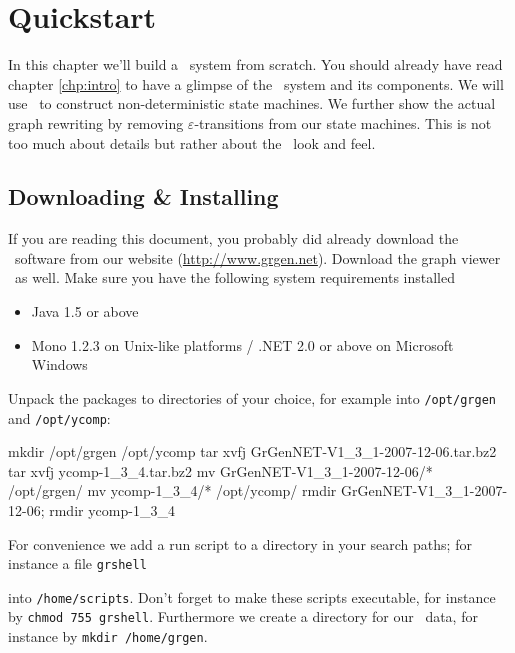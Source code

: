 \chapter{Quickstart}

In this chapter we'll build a \GrG\ system from scratch. 
You should already have read chapter \ref{chp:intro} to have a glimpse of the \GrG\ system and its components.
We will use \GrG\ to construct non-deterministic state machines.
We further show the actual graph rewriting by removing $\varepsilon$-transitions from our state machines.
This is not too much about details but rather about the \GrG\ look and feel.

\section{Downloading \& Installing}
If you are reading this document, you probably did already download the \GrG\ software from our website (\url{http://www.grgen.net}).
Download the graph viewer \yComp\ as well.
Make sure you have the following system requirements installed
\begin{itemize}
	\item Java 1.5 or above
	\item Mono 1.2.3 on Unix-like platforms / .NET 2.0 or above on Microsoft Windows 
\end{itemize}
Unpack the packages to directories of your choice, for example into \texttt{/opt/grgen} and \texttt{/opt/ycomp}:
\begin{bash}
mkdir /opt/grgen /opt/ycomp
tar xvfj GrGenNET-V1_3_1-2007-12-06.tar.bz2
tar xvfj ycomp-1_3_4.tar.bz2
mv GrGenNET-V1_3_1-2007-12-06/* /opt/grgen/
mv ycomp-1_3_4/* /opt/ycomp/
rmdir GrGenNET-V1_3_1-2007-12-06; rmdir ycomp-1_3_4
\end{bash}
For convenience we add a run script to a directory in your search paths; for instance a file \texttt{grshell}
into \texttt{/home/scripts}.
Don't forget to make these scripts executable, for instance by \texttt{chmod 755 grshell}.
Furthermore we create a directory for our \GrG\ data, for instance by \texttt{mkdir /home/grgen}.

